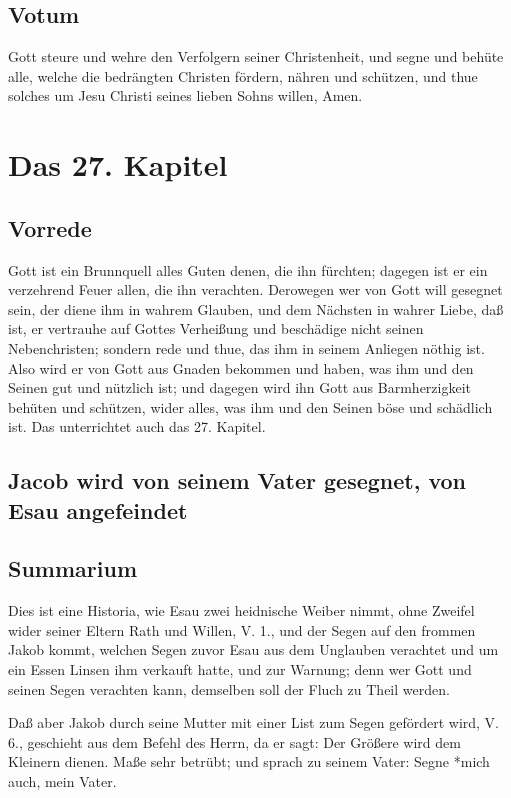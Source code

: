 \section{Votum}

Gott steure und wehre den Verfolgern seiner Christenheit, und segne und behüte alle, welche die bedrängten Christen fördern, nähren und schützen, und thue solches um Jesu Christi seines lieben Sohns willen, Amen.

\chapter{Das 27. Kapitel}

\section{Vorrede}

Gott ist ein Brunnquell alles Guten denen, die ihn fürchten; dagegen ist er ein verzehrend Feuer allen, die ihn verachten. Derowegen wer von Gott will gesegnet sein, der diene ihm in wahrem Glauben, und dem Nächsten in wahrer Liebe, daß ist, er vertrauhe auf Gottes Verheißung und beschädige nicht seinen Nebenchristen; sondern rede und thue, das ihm in seinem Anliegen nöthig ist. Also wird er von Gott aus Gnaden bekommen und haben, was ihm und den Seinen gut und nützlich ist; und dagegen wird ihn Gott aus Barmherzigkeit behüten und schützen, wider alles, was ihm und den Seinen böse und schädlich ist. Das unterrichtet auch das 27. Kapitel.

\section[Jacob wird von seinem Vater gesegnet, von Esau]{Jacob wird von seinem Vater gesegnet, von Esau angefeindet}

\section{Summarium}

Dies ist eine Historia, wie Esau zwei heidnische Weiber nimmt, ohne Zweifel wider seiner Eltern Rath und Willen, V. 1., und der Segen auf den frommen Jakob kommt, welchen Segen zuvor Esau aus dem Unglauben verachtet und um ein Essen Linsen ihm verkauft hatte, und zur Warnung; denn wer Gott und seinen Segen verachten kann, demselben soll der Fluch zu Theil werden.

Daß aber Jakob durch seine Mutter mit einer List zum Segen gefördert wird, V. 6., geschieht aus dem Befehl des Herrn, da er sagt: Der Größere wird dem Kleinern dienen.
Maße sehr betrübt; und sprach zu seinem Vater: Segne *mich auch, mein Vater.


